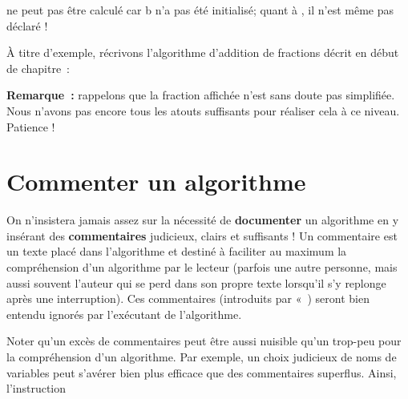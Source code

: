 		 ne peut pas être calculé car b n'a pas été initialisé;
		quant à , il n'est même pas déclaré !

		\bigskip
			
		À titre d’exemple, récrivons l’algorithme d’addition de fractions décrit
		en début de chapitre~:

		
		\textbf{Remarque~:}
		rappelons que la fraction affichée n'est sans doute pas simplifiée. 
		Nous n'avons pas encore tous les atouts suffisants pour réaliser 
		cela à ce niveau. Patience !

	\section{Commenter un algorithme}

		On n’insistera jamais assez sur la nécessité de \textbf{documenter} un
		algorithme en y insérant des \textbf{commentaires} judicieux, clairs et
		suffisants ! Un commentaire est un texte placé dans
		l'algorithme et destiné à faciliter au maximum la
		compréhension d’un algorithme par le lecteur (parfois une autre
		personne, mais aussi souvent l'auteur qui se perd dans
		son propre texte lorsqu'il s'y replonge après une
		interruption). Ces commentaires (introduits par
		«~) seront bien entendu ignorés par
		l’exécutant de l’algorithme.


		Noter qu’un excès de commentaires peut être aussi nuisible qu’un
		trop-peu pour la compréhension d’un algorithme. Par exemple, un choix
		judicieux de noms de variables peut s’avérer bien plus efficace que des
		commentaires superflus. Ainsi, l’instruction

